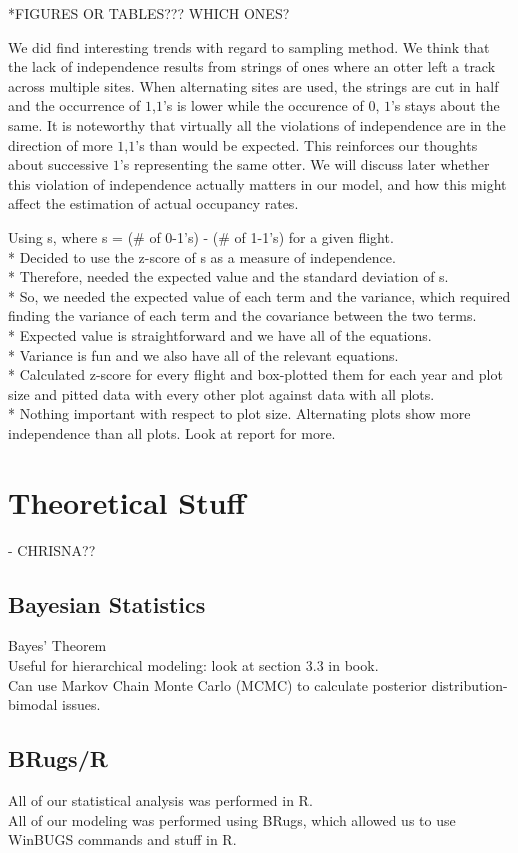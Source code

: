 \documentclass{article}
\begin{document}
*FIGURES OR TABLES??? WHICH ONES?

	We did find interesting trends with regard to sampling method.  We think that 
the lack of independence results from strings of ones where an otter left a track
across multiple sites.  When alternating sites are used, the strings are cut in 
half and the occurrence of \(1\),\(1\)'s is lower while the occurence of \(0\),
\(1\)'s stays about the same.  It is noteworthy that virtually all the violations
of independence are in the direction of more \(1\),\(1\)'s than would be expected.
This reinforces our thoughts about successive \(1\)'s representing the same otter.
We will discuss later whether this violation of independence actually matters in 
our model, and how this might affect the estimation of actual occupancy rates.
 

   		Using s, where s = (\# of 0-1's) - (\# of 1-1's) for a given flight.\\
          * Decided to use the z-score of s as a measure of independence.  \\
          * Therefore, needed the expected value and the standard deviation of s. \\
          * So, we needed the expected value of each term and the variance, which 
			required finding the variance of each term and the covariance between 
			the two terms. \\
          * Expected value is straightforward and we have all of the equations. \\
          * Variance is fun and we also have all of the relevant equations. \\
          * Calculated z-score for every flight and box-plotted them for each year
			and plot size and pitted data with every other plot against data with
			all plots. \\
          * Nothing important with respect to plot size. Alternating plots show 
			more independence than all plots. Look at report for more. \\


\section{Theoretical Stuff} - CHRISNA??
	\subsection{Bayesian Statistics}
	   	Bayes' Theorem \\
    	Useful for hierarchical modeling: look at section 3.3 in book. \\
    	Can use Markov Chain Monte Carlo (MCMC) to calculate posterior 
			distribution- bimodal issues.
	\subsection{BRugs/R}
    	All of our statistical analysis was performed in R.  \\
    	All of our modeling was performed using BRugs, which allowed us to use 
			WinBUGS commands and stuff in R.
\end{document}
